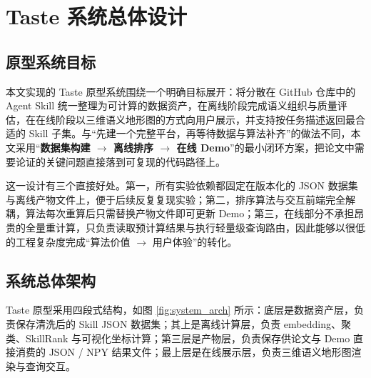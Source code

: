 
\chapter{Taste 系统总体设计}
\label{cha:design}

\section{原型系统目标}
\label{sec:arch_overview}

本文实现的 Taste 原型系统围绕一个明确目标展开：将分散在 GitHub 仓库中的 Agent Skill 统一整理为可计算的数据资产，在离线阶段完成语义组织与质量评估，在在线阶段以三维语义地形图的方式向用户展示，并支持按任务描述返回最合适的 Skill 子集。与“先建一个完整平台，再等待数据与算法补齐”的做法不同，本文采用“\textbf{数据集构建 $\rightarrow$ 离线排序 $\rightarrow$ 在线 Demo}”的最小闭环方案，把论文中需要论证的关键问题直接落到可复现的代码路径上。

这一设计有三个直接好处。第一，所有实验依赖都固定在版本化的 JSON 数据集与离线产物文件上，便于后续反复复现实验；第二，排序算法与交互前端完全解耦，算法每次重算后只需替换产物文件即可更新 Demo；第三，在线部分不承担昂贵的全量重计算，只负责读取预计算结果与执行轻量级查询路由，因此能够以很低的工程复杂度完成“算法价值 $\rightarrow$ 用户体验”的转化。

\section{系统总体架构}

Taste 原型采用四段式结构，如图 \ref{fig:system_arch} 所示：底层是数据资产层，负责保存清洗后的 Skill JSON 数据集；其上是离线计算层，负责 embedding、聚类、SkillRank 与可视化坐标计算；第三层是产物层，负责保存供论文与 Demo 直接消费的 JSON / NPY 结果文件；最上层是在线展示层，负责三维语义地形图渲染与查询交互。

